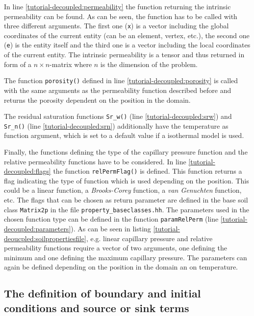 In line \ref{tutorial-decoupled:permeability} the function returning the intrinsic permeability can be found. As can be seen, the function has to be called with three different arguments. The first one (\texttt{x}) is a vector including the global coordinates of the current entity (can be an element, vertex, etc.), the second one (\texttt{e}) is the entity itself and the third one is a vector including the local coordinates of the current entity. The intrinsic permeability is a tensor and thus returned in form of a $n \times n$-matrix where $n$ is the dimension of the problem.

The function \texttt{porosity()} defined in line \ref{tutorial-decoupled:porosity} is called with the same arguments as the permeability function described before and returns the porosity dependent on the position in the domain.

The residual saturation functions \texttt{Sr\_w()} (line \ref{tutorial-decoupled:srw}) and \texttt{Sr\_n()} (line \ref{tutorial-decoupled:srn}) additionally have the temperature as function argument, which is set to a default value if a isothermal model is used.

Finally, the functions defining the type of the capillary pressure function and the relative permeability functions have to be considered. In line \ref{tutorial-decoupled:flags} the function \texttt{relPermFlag()} is defined. This function returns a flag indicating the type of function which is used depending on the position. This could be a linear function, a \textit{Brooks-Corey} function, a \textit{van Genuchten} function, etc. The flags that can be chosen as return parameter are defined in the base soil class \texttt{Matrix2p} in the file \texttt{property\_baseclasses.hh}. The parameters used in the chosen function type can be defined in the function \texttt{paramRelPerm} (line \ref{tutorial-decoupled:parameters}). As can be seen in listing \ref{tutorial-deoucpled:soilpropertiesfile}, e.g. linear capillary pressure and relative permeability functions require a vector of two arguments, one defining the minimum and one defining the maximum capillary pressure. The parameters can again be defined depending on the position in the domain an on temperature.

\subsection{The definition of boundary and initial conditions and source or sink terms}\label{tutorial-decoupled:description-bc-ic}

